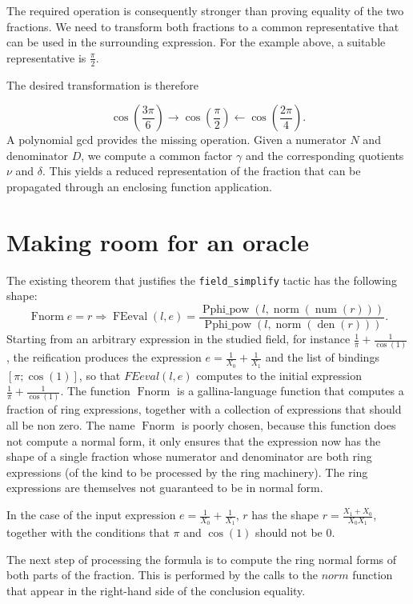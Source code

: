 \documentclass{jflart}
\begin{document}
The required operation is consequently stronger than proving equality of
the two fractions. We need to transform both fractions to a common
representative that can be used in the surrounding expression. For the
example above, a suitable representative is $ \frac{\pi}{2}$.


The desired transformation is therefore

$$
  \cos\left(\frac{3\pi}{6}\right)
  \longrightarrow
  \cos\left(\frac{\pi}{2}\right)
  \longleftarrow
  \cos\left(\frac{2\pi}{4}\right).
$$
A polynomial gcd provides the missing operation. Given a numerator \(N\) and denominator \(D\), we compute a common factor \(\gamma\) and the corresponding quotients \(\nu\) and \(\delta\). This yields a reduced representation of the fraction that can be propagated through an enclosing function application.


\section{Making room for an oracle}
The existing theorem that justifies the \texttt{field\_simplify} tactic has the
following shape:
\[
 \operatorname{Fnorm} e = r \Longrightarrow
 \operatorname{FEeval}(l,e)=
 \frac{\operatorname{Pphi\_pow}(l,\operatorname{norm}(\operatorname{num}(r)))}
  {\operatorname{Pphi\_pow}(l,\operatorname{norm}(\operatorname{den}(r)))}.
\]
Starting from an arbitrary expression in the studied field, for instance \(\frac{1}{\pi} + \frac{1}{\cos(1)}\), the reification produces the expression
\(e = \frac{1}{X_0} + \frac{1}{X_1}\) and the list of bindings \([\pi;\cos(1)]\),
so that \(FEeval(l, e)\) computes to the initial expression 
\(\frac{1}{\pi} + \frac{1}{\cos(1)}\).  The function \(\operatorname{Fnorm}\) is a gallina-language function that computes a fraction of ring expressions, together with a collection of expressions that should all be non zero.  The name \(\operatorname{Fnorm}\) is poorly chosen, because this function does not compute a normal form, it only ensures that the expression now has the shape of a single fraction whose numerator and denominator are both ring expressions (of the kind to be processed by the ring machinery).  The ring expressions are themselves not guaranteed to be in normal form.

In the case of the input expression \(e = \frac{1}{X_0} + \frac{1}{X_1}\), \(r\) has the shape \(r = \frac{X_1 + X_0}{X_0 X_1}\), together with the conditions that \(\pi\) and \(\cos(1)\) should not be 0.

The next step of processing the formula is to compute the ring normal forms of both parts of the fraction. This is performed by the calls to the \(norm\)
function that appear in the right-hand side of the conclusion equality.
\end{document}
